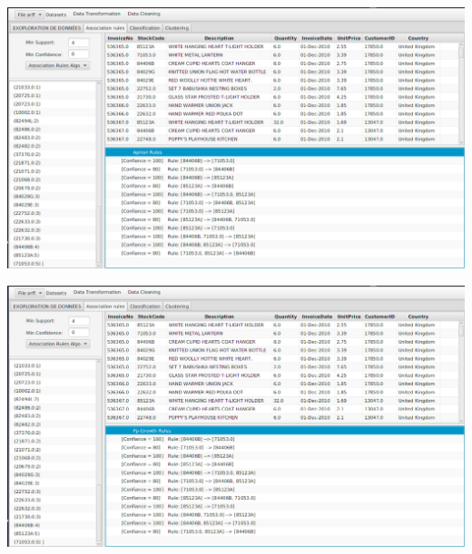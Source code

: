 \documentclass[12pt,a4paper,oneside]{book}
\begin{document}
	\begin{frame}{}
		\centering
		\begin{minipage}[b]{0.5\linewidth}
			\includegraphics[width=1\textwidth]{images/apriori_supp4.png}%
			\label{labelname}%
		\end{minipage}
		\hspace{0.5cm}
		\begin{minipage}[b]{0.5\linewidth}
			\includegraphics[width=1\textwidth]{images/fpg_supp4.png}%
			\label{labelname}%
		\end{minipage}
	\end{frame}
	
\end{document}
